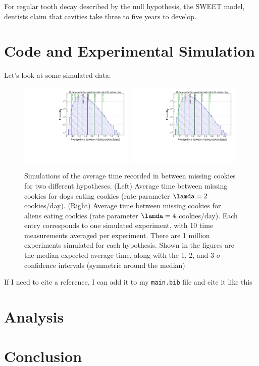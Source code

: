 \documentclass[11pt]{article}
\begin{document}
For regular tooth decay described by the null hypothesis, the SWEET model, dentists claim that cavities take three to five years to develop.

\section{Code and Experimental Simulation \label{sec:code}}
Let's look at some simulated data:

\begin{figure}[htb]
\begin{center}
\includegraphics[width=0.49\textwidth]{fig/times_avg_dogs_quant.pdf}
\includegraphics[width=0.49\textwidth]{fig/times_avg_aliens_quant.pdf}
\caption{{\small Simulations of the average time recorded in between missing cookies for two different hypotheses. (Left) Average time between missing cookies for dogs eating cookies (rate parameter $\lamda = 2$ cookies/day). (Right) Average time between missing cookies for aliens eating cookies (rate parameter $\lamda = 4$ cookies/day). Each entry corresponds to one simulated experiment, with 10 time measurements averaged per experiment. There are 1 million experiments simulated for each hypothesis. Shown in the figures are the median expected average time, along with the 1, 2, and 3 $\sigma$ confidence intervals (symmetric around the median)}}
\label{fig:somedata}
\end{center}  
\end{figure}

If I need to cite a reference, I can add it to my \texttt{main.bib} file and cite it like this~\cite{PhysRevD.57.3873}

\clearpage
\section{Analysis \label{sec:analysis}}

\section{Conclusion \label{sec:conclusion}}


\renewcommand{\refname}{Here are the references}

\end{document}
